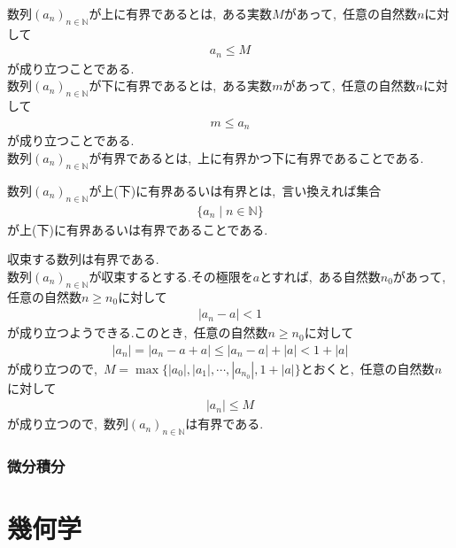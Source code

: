 \documentclass[hyperref,a4paper,12pt]{kininaruki}
\begin{document}
\begin{shadebox}
    数列$(a_{n})_{n\in \mathbb{N}}$が上に有界であるとは,\, ある実数$M$があって,\, 任意の自然数$n$に対して
    \begin{align}
        a_{n} \leq M
    \end{align}
    が成り立つことである.\\
    数列$(a_{n})_{n\in \mathbb{N}}$が下に有界であるとは,\, ある実数$m$があって,\, 任意の自然数$n$に対して
    \begin{align}
        m \leq a_{n}
    \end{align}
    が成り立つことである.\\
    数列$(a_{n})_{n\in \mathbb{N}}$が有界であるとは,\, 上に有界かつ下に有界であることである.
    \begin{boxnote}
        数列$(a_{n})_{n\in \mathbb{N}}$が上(下)に有界あるいは有界とは,\, 言い換えれば集合
        \begin{align*}
            \{a_{n} \mid n\in \mathbb{N}\}
        \end{align*}
        が上(下)に有界あるいは有界であることである.
    \end{boxnote}
\end{shadebox}
収束する数列は有界である.\\
数列$(a_{n})_{n\in \mathbb{N}}$が収束するとする.その極限を$a$とすれば,\, ある自然数$n_{0}$があって,\, 任意の自然数$n\geq n_{0}$に対して
\begin{align*}
    |a_{n} - a| < 1
\end{align*}
が成り立つようできる.このとき,\, 任意の自然数$n\geq n_{0}$に対して
\begin{align*}
    |a_{n}| = |a_{n} - a + a| \leq |a_{n} - a| + |a| < 1 + |a|
\end{align*}
が成り立つので,\, $M = \max\{|a_{0}|,|a_{1}|,\cdots,|a_{n_{0}}|,1 + |a|\}$とおくと,\, 任意の自然数$n$に対して
\begin{align*}
    |a_{n}| \leq M
\end{align*}
が成り立つので,\, 数列$(a_{n})_{n\in \mathbb{N}}$は有界である.\\








\newpage
\section{微分積分}
\newpage
\part{幾何学}
\end{document}
